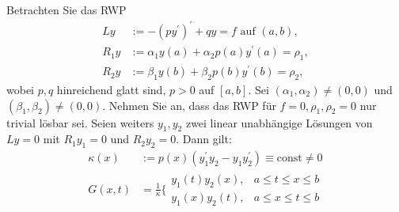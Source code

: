 \begin{exercise}
Betrachten Sie das RWP
\begin{align*}
  Ly &:= -(py^{\prime})^{\prime} + qy = f \text{ auf } (a,b), \\
  R_1y &:= \alpha_1y(a) + \alpha_2p(a)y^{\prime}(a) = \rho_1, \\
  R_2y &:= \beta_1y(b) + \beta_2p(b)y^{\prime}(b) = \rho_2,
\end{align*}
wobei $p,q$ hinreichend glatt sind, $p > 0$ auf $[a,b]$. Sei $(\alpha_1,\alpha_2) \neq (0,0)$
und $(\beta_1,\beta_2) \neq (0,0)$. Nehmen Sie an, dass das RWP für $f = 0, \rho_1,\rho_2 = 0$
nur trivial lösbar sei. Seien weiters $y_1,y_2$ zwei linear unabhängige Lösungen
von $Ly = 0$ mit $R_1y_1 = 0$ und $R_2y_2 = 0$. Dann gilt:
\begin{align*}
  \kappa(x) &:= p(x)(y_1^{\prime}y_2 - y_1y_2^{\prime}) \equiv \text{const} \neq 0 \\
  G(x,t) &= \frac{1}{\kappa}\Bigg\{\begin{matrix}
    y_1(t)y_2(x), & a \leq t \leq x \leq b \\
    y_1(x)y_2(t), & a \leq x \leq t \leq b
  \end{matrix}
\end{align*}
\end{exercise}

